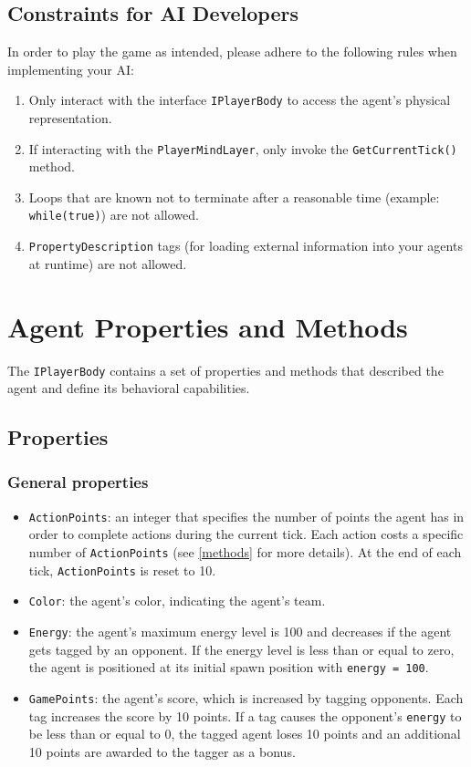 \documentclass[
    a4paper,
    english,
    DIV=16,
    11pt,
    parskip=half,
    listof=totoc,		%
    index=totoc,		%
    bibliography=totoc,	%
]{scrartcl}
\begin{document}
\subsection{Constraints for AI Developers}
In order to play the game as intended, please adhere to the following rules when implementing your AI:
\begin{enumerate}
    \item Only interact with the interface \texttt{IPlayerBody} to access the agent's physical representation.
    \item If interacting with the \texttt{PlayerMindLayer}, only invoke the \texttt{GetCurrentTick()} method. \item Loops that are known not to terminate after a reasonable time (example: \texttt{while(true)}) are not allowed.
    \item \texttt{PropertyDescription} tags (for loading external information into your agents at runtime) are not allowed.
\end{enumerate}

\section{Agent Properties and Methods} \label{AgentDesc}
The \texttt{IPlayerBody} contains a set of properties and methods that described the agent and define its behavioral capabilities.

\subsection{Properties}

\subsubsection{General properties} \label{genAttr}
\begin{itemize}
    \item \texttt{ActionPoints}: an integer that specifies the number of points the agent has in order to complete actions during the current tick. Each action costs a specific number of \texttt{ActionPoints} (see \ref{methods} for more details). At the end of each tick, \texttt{ActionPoints} is reset to 10.
    \item \texttt{Color}: the agent's color, indicating the agent's team.
    \item \texttt{Energy}: the agent's maximum energy level is 100 and decreases if the agent gets tagged by an opponent. If the energy level is less than or equal to zero, the agent is positioned at its initial spawn position with \texttt{energy = 100}.
    \item \texttt{GamePoints}: the agent's score, which is increased by tagging opponents. Each tag increases the score by 10 points. If a tag causes the opponent's \texttt{energy} to be less than or equal to 0, the tagged agent loses 10 points and an additional 10 points are awarded to the tagger as a bonus.
\end{itemize}
\end{document}
